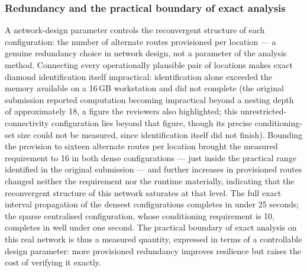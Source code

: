\documentclass[preprint,12pt]{elsarticle}
\theoremstyle{definition}
\begin{document}
\subsubsection{Redundancy and the practical boundary of exact analysis}\label{sec:redundancy}

A network-design parameter controls the reconvergent structure of each configuration: the number of
alternate routes provisioned per location --- a genuine redundancy choice in network design, not a
parameter of the analysis method. Connecting every operationally plausible pair of locations makes
exact diamond identification itself impractical: identification alone exceeded the memory available on
a 16\,GB workstation and did not complete (the original submission reported computation becoming
impractical beyond a nesting depth of approximately 18, a figure the reviewers also highlighted; this
unrestricted-connectivity configuration lies beyond that figure, though its precise conditioning-set
size could not be measured, since identification itself did not finish). Bounding the provision to
sixteen alternate routes per location brought the measured requirement to 16 in both dense
configurations --- just inside the practical range identified in the original submission --- and further increases in provisioned routes
changed neither the requirement nor the runtime materially, indicating that the reconvergent structure
of this network saturates at that level. The full exact interval propagation of the densest
configurations completes in under 25 seconds; the sparse centralised configuration, whose conditioning
requirement is 10, completes in well under one second. The practical boundary of exact analysis on this
real network is thus a measured quantity, expressed in terms of a controllable design parameter: more
provisioned redundancy improves resilience but raises the cost of verifying it exactly.
\end{document}
